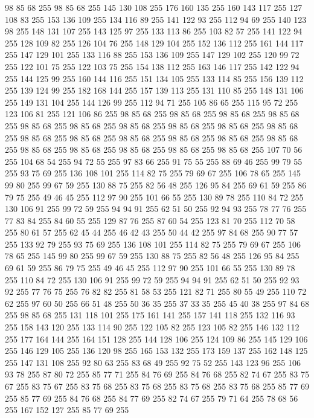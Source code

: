 98 85 68 255 98 85 68 255 145 130 108 255 176 160 135 255 160 143 117 255 127 108 83 255 153 136 109 255 134 116 89 255 141 122 93 255 112 94 69 255 140 123 98 255 148 131 107 255 143 125 97 255 133 113 86 255 103 82 57 255 141 122 94 255 128 109 82 255 126 104 76 255 148 129 104 255 152 136 112 255 161 144 117 255 147 129 101 255 133 116 88 255 153 136 109 255 147 129 102 255 120 99 72 255 122 101 75 255 122 103 75 255 154 138 112 255 163 146 117 255 142 122 94 255 144 125 99 255 160 144 116 255 151 134 105 255 133 114 85 255 156 139 112 255 139 124 99 255 182 168 144 255 157 139 113 255 131 110 85 255 148 131 106 255 149 131 104 255 144 126 99 255 112 94 71 255 105 86 65 255 115 95 72 255 123 106 81 255 121 106 86 255 98 85 68 255 98 85 68 255 98 85 68 255 98 85 68 255 98 85 68 255 98 85 68 255 98 85 68 255 98 85 68 255 98 85 68 255 98 85 68 255 98 85 68 255 98 85 68 255 98 85 68 255 98 85 68 255 98 85 68 255 98 85 68 255
98 85 68 255 98 85 68 255 98 85 68 255 98 85 68 255 98 85 68 255 107 70 56 255 104 68 54 255 94 72 55 255 97 83 66 255 91 75 55 255 88 69 46 255 99 79 55 255 93 75 69 255 136 108 101 255 114 82 75 255 79 69 67 255 106 78 65 255 145 99 80 255 99 67 59 255 130 88 75 255 82 56 48 255 126 95 84 255 69 61 59 255 86 79 75 255 49 46 45 255 112 97 90 255 101 66 55 255 130 89 78 255 110 84 72 255 130 106 91 255 99 72 59 255 94 94 91 255 62 51 50 255 92 94 93 255 78 77 76 255 77 83 84 255 84 60 55 255 129 87 76 255 87 60 54 255 123 81 70 255 112 70 58 255 80 61 57 255 62 45 44 255 46 42 43 255 50 44 42 255 97 84 68 255 90 77 57 255 133 92 79 255 93 75 69 255 136 108 101 255 114 82 75 255 79 69 67 255 106 78 65 255 145 99 80 255 99 67 59 255 130 88 75 255 82 56 48 255 126 95 84 255 69 61 59 255 86 79 75 255 49 46 45 255 112 97 90 255 101 66 55 255 130 89 78 255
110 84 72 255 130 106 91 255 99 72 59 255 94 94 91 255 62 51 50 255 92 93 92 255 77 76 75 255 76 82 82 255 81 58 53 255 121 82 71 255 80 55 49 255 110 72 62 255 97 60 50 255 66 51 48 255 50 36 35 255 37 33 35 255 45 40 38 255 97 84 68 255 98 85 68 255 131 118 101 255 175 161 141 255 157 141 118 255 132 116 93 255 158 143 120 255 133 114 90 255 122 105 82 255 123 105 82 255 146 132 112 255 177 164 144 255 164 151 128 255 144 128 106 255 124 109 86 255 145 129 106 255 146 129 105 255 136 120 98 255 165 153 132 255 173 159 137 255 162 148 125 255 147 131 108 255 92 80 63 255 83 68 49 255 92 75 52 255 143 123 96 255 106 93 78 255 87 80 72 255 85 77 71 255 84 76 69 255 84 76 68 255 82 74 67 255 83 75 67 255 83 75 67 255 83 75 68 255 83 75 68 255 83 75 68 255 83 75 68 255 85 77 69 255 85 77 69 255 84 76 68 255 84 77 69 255 82 74 67 255 79 71 64 255 78 68 56 255 167 152 127 255 85 77 69 255
